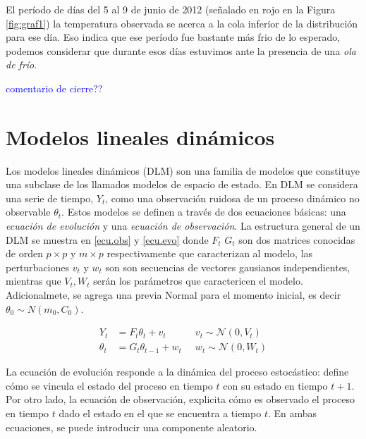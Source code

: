 \documentclass[12pt]{article}\usepackage[]{graphicx}\usepackage[]{color}
\begin{document}
El período de días del 5 al 9 de junio de 2012 (señalado en rojo en la Figura \ref{fig:graf1}) la temperatura observada se acerca a la cola inferior de la distribución para ese día. Eso indica que ese período fue bastante más frio de lo esperado, podemos considerar que durante esos días estuvimos ante la presencia de una \textit{ola de frío}. 

\textcolor{blue}{comentario de cierre??}

\section{Modelos lineales dinámicos}\label{DLM}

%

Los modelos lineales dinámicos (DLM) son una familia de modelos que constituye una subclase de los llamados modelos de espacio de estado. En DLM se considera una serie de tiempo, $Y_t$, como una observación ruidosa de un proceso dinámico no observable $\theta_t$. Estos modelos se definen a través de dos ecuaciones básicas: una \textit{ecuación de evolución} y una \textit{ecuación de observación}. La estructura general de un DLM se muestra en \eqref{ecu.obs} y \eqref{ecu.evo} donde $F_t$ $G_t$ son dos matrices conocidas de orden $p\times p$ y $m\times p$ respectivamente que caracterizan al modelo, las perturbaciones $v_t$ y $w_t$ son son secuencias de vectores gausianos independientes, mientras que $V_t,W_t$ serán los parámetros que caractericen el modelo. Adicionalmete, se agrega una previa Normal para el momento inicial, es decir $\theta_0 \sim N(m_0, C_0)$. 

\begin{eqnarray}
\label{ecu.obs} Y_t&= F_t\theta_t + v_t  \;&\;  v_t \sim \mathcal{N}(0,V_t) \\
\label{ecu.evo} \theta_t &= G_t \theta_{t-1} + w_t \;&\; w_t \sim \mathcal{N}(0,W_t)
\end{eqnarray} 

La ecuación de evolución responde a la dinámica del proceso estocástico: define cómo se vincula el estado del proceso en tiempo $t$ con su estado en tiempo $t+1$. Por otro lado, la ecuación de observación, explicita cómo es observado el proceso en tiempo $t$ dado el estado en el que se encuentra a tiempo $t$. En ambas ecuaciones, se puede introducir una componente aleatorio. 
\end{document}
